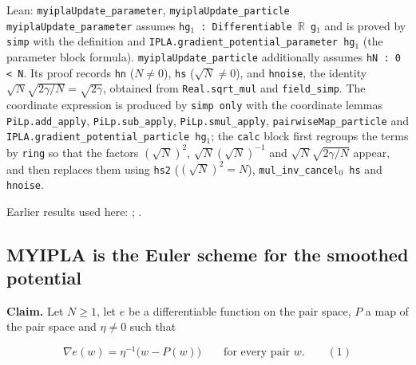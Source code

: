 \documentclass[11pt,a4paper]{report}
\begin{document}
\begin{leanbox}{Lean: \texttt{myiplaUpdate\_\allowbreak{}parameter}, \texttt{myiplaUpdate\_\allowbreak{}particle}}
\texttt{myipla\allowbreak{}Update\_\allowbreak{}parameter} assumes \texttt{hg\ensuremath{{}_{1}} : Differentiable \ensuremath{\mathbb R} g\ensuremath{{}_{1}}} and is proved by \texttt{simp} with the definition and \texttt{IPLA.\allowbreak{}gradient\_\allowbreak{}potential\_\allowbreak{}parameter hg\ensuremath{{}_{1}}} (the parameter block formula). \texttt{myipla\allowbreak{}Update\_\allowbreak{}particle} additionally assumes \texttt{h\allowbreak{}N : 0 < N}. Its proof records \texttt{hn} (\(N\ne0\)), \texttt{hs} (\(\sqrt N\ne0\)), and \texttt{hnoise}, the identity \(\sqrt N\sqrt{2\gamma/N}=\sqrt{2\gamma}\), obtained from \texttt{Real.\allowbreak{}sqrt\_\allowbreak{}mul} and \texttt{field\_\allowbreak{}simp}. The coordinate expression is produced by \texttt{simp only} with the coordinate lemmas \texttt{Pi\allowbreak{}Lp.\allowbreak{}add\_\allowbreak{}apply}, \texttt{Pi\allowbreak{}Lp.\allowbreak{}sub\_\allowbreak{}apply}, \texttt{Pi\allowbreak{}Lp.\allowbreak{}smul\_\allowbreak{}apply}, \texttt{pairwise\allowbreak{}Map\_\allowbreak{}particle} and \texttt{IPLA.\allowbreak{}gradient\_\allowbreak{}potential\_\allowbreak{}particle hg\ensuremath{{}_{1}}}; the \texttt{calc} block first regroups the terms by \texttt{ring} so that the factors \((\sqrt N)^2\), \(\sqrt N(\sqrt N)^{-1}\) and \(\sqrt N\sqrt{2\gamma/N}\) appear, and then replaces them using \texttt{hs2} (\((\sqrt N)^2=N\)), \texttt{mul\_\allowbreak{}inv\_\allowbreak{}cancel\ensuremath{{}_{0}} hs} and \texttt{hnoise}.
\end{leanbox}


Earlier results used here: \cite[Section~3.1.1]{LangevinLean2026IPLA}; \cite[Section~3.1.5]{LangevinLean2026IPLA}.
\subsection{\texorpdfstring{MYIPLA is the Euler scheme for the smoothed potential}{MYIPLA is the Euler scheme for the smoothed potential}}
\label{report-step-ProximalLangevin-Algorithms-lean-6}


\textbf{Claim.} Let \(N\ge1\), let \(e\) be a differentiable function on the pair space, \(P\) a map of the pair space and \(\eta\ne0\) such that


\[\nabla e(w)=\eta^{-1}\bigl(w-P(w)\bigr)\qquad\text{for every pair }w.\qquad(1)\]
\end{document}
